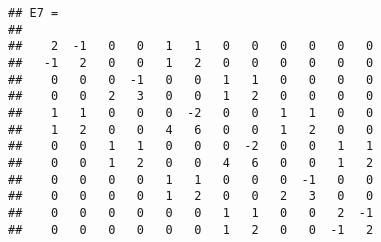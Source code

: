 \begin{samepage}
\begin{Shaded}
	\begin{Highlighting}[]
\NormalTok{v=[}\NormalTok{;}\NormalTok{,}\NormalTok{);}\NormalTok{];}
\NormalTok{v1=[}\NormalTok{;}\NormalTok{;}\NormalTok{,}\NormalTok{);}\NormalTok{;}\NormalTok{];}
\NormalTok{v2=[}\NormalTok{;}\NormalTok{;}\NormalTok{*}\NormalTok{(}\NormalTok{));}\NormalTok{;}\NormalTok{];}

\NormalTok{(}
\NormalTok{(}
\NormalTok{(}
\NormalTok{(}\NormalTok{(}\NormalTok{(}\NormalTok{)),}
\NormalTok{(}\NormalTok{(}\NormalTok{(}\NormalTok{)),-}		
	\end{Highlighting}
\end{Shaded}
\end{samepage}

\begin{samepage}
\begin{verbatim}
## E7 =
## 
##    2  -1   0   0   1   1   0   0   0   0   0   0
##   -1   2   0   0   1   2   0   0   0   0   0   0
##    0   0   0  -1   0   0   1   1   0   0   0   0
##    0   0   2   3   0   0   1   2   0   0   0   0
##    1   1   0   0   0  -2   0   0   1   1   0   0
##    1   2   0   0   4   6   0   0   1   2   0   0
##    0   0   1   1   0   0   0  -2   0   0   1   1
##    0   0   1   2   0   0   4   6   0   0   1   2
##    0   0   0   0   1   1   0   0   0  -1   0   0
##    0   0   0   0   1   2   0   0   2   3   0   0
##    0   0   0   0   0   0   1   1   0   0   2  -1
##    0   0   0   0   0   0   1   2   0   0  -1   2
\end{verbatim}
\end{samepage}

